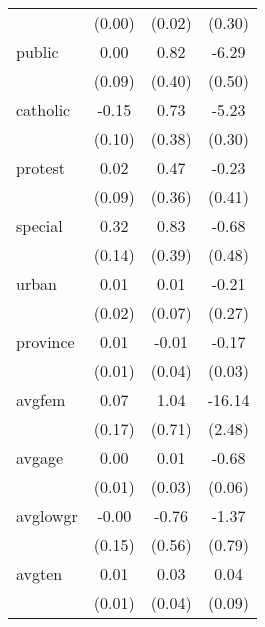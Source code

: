 \documentclass{article}
\begin{document}
{\begin{tabular}{l*{3}{c}}
            &      (0.00)         &      (0.02)         &      (0.30)         \\
[1em]
public      &        0.00         &        0.82\sym{**} &       -6.29\sym{***}\\
            &      (0.09)         &      (0.40)         &      (0.50)         \\
[1em]
catholic    &       -0.15         &        0.73\sym{*}  &       -5.23\sym{***}\\
            &      (0.10)         &      (0.38)         &      (0.30)         \\
[1em]
protest     &        0.02         &        0.47         &       -0.23         \\
            &      (0.09)         &      (0.36)         &      (0.41)         \\
[1em]
special     &        0.32\sym{**} &        0.83\sym{**} &       -0.68         \\
            &      (0.14)         &      (0.39)         &      (0.48)         \\
[1em]
urban       &        0.01         &        0.01         &       -0.21         \\
            &      (0.02)         &      (0.07)         &      (0.27)         \\
[1em]
province    &        0.01         &       -0.01         &       -0.17\sym{***}\\
            &      (0.01)         &      (0.04)         &      (0.03)         \\
[1em]
avgfem      &        0.07         &        1.04         &      -16.14\sym{***}\\
            &      (0.17)         &      (0.71)         &      (2.48)         \\
[1em]
avgage      &        0.00         &        0.01         &       -0.68\sym{***}\\
            &      (0.01)         &      (0.03)         &      (0.06)         \\
[1em]
avglowgr    &       -0.00         &       -0.76         &       -1.37\sym{*}  \\
            &      (0.15)         &      (0.56)         &      (0.79)         \\
[1em]
avgten      &        0.01         &        0.03         &        0.04         \\
            &      (0.01)         &      (0.04)         &      (0.09)         \\

\end{tabular}}
\end{document}
